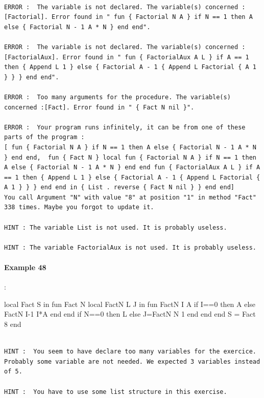 \documentclass[11pt,a4paper,twoside,openright]{report}
\begin{document}
\begin{lstlisting}

ERROR :  The variable is not declared. The variable(s) concerned :[Factorial]. Error found in " fun { Factorial N A } if N == 1 then A else { Factorial N - 1 A * N } end end".

ERROR :  The variable is not declared. The variable(s) concerned :[FactorialAux]. Error found in " fun { FactorialAux A L } if A == 1 then { Append L 1 } else { Factorial A - 1 { Append L Factorial { A 1 } } } end end".

ERROR :  Too many arguments for the procedure. The variable(s) concerned :[Fact]. Error found in " { Fact N nil }".

ERROR :  Your program runs infinitely, it can be from one of these parts of the program : 
[ fun { Factorial N A } if N == 1 then A else { Factorial N - 1 A * N } end end,  fun { Fact N } local fun { Factorial N A } if N == 1 then A else { Factorial N - 1 A * N } end end fun { FactorialAux A L } if A == 1 then { Append L 1 } else { Factorial A - 1 { Append L Factorial { A 1 } } } end end in { List . reverse { Fact N nil } } end end]
You call Argument "N" with value "8" at position "1" in method "Fact" 338 times. Maybe you forgot to update it.

HINT : The variable List is not used. It is probably useless.

HINT : The variable FactorialAux is not used. It is probably useless.
\end{lstlisting}

\paragraph{Example 48}:

\begin{OZ}

local Fact S in 
	fun {Fact N}
		local FactN L J in
			  fun {FactN I A}
				 if I==0 then A
				 else {FactN I-1 I*A}
				 end
			  end
	  		if N==0 then L
			  else
				 J={FactN N 1}
			  end
		   end
		end
	S = {Fact 8}
end

\end{OZ}
\begin{lstlisting}

HINT :  You seem to have declare too many variables for the exercice. Probably some variable are not needed. We expected 3 variables instead of 5.

HINT :  You have to use some list structure in this exercise.

\end{lstlisting}
\end{document}
